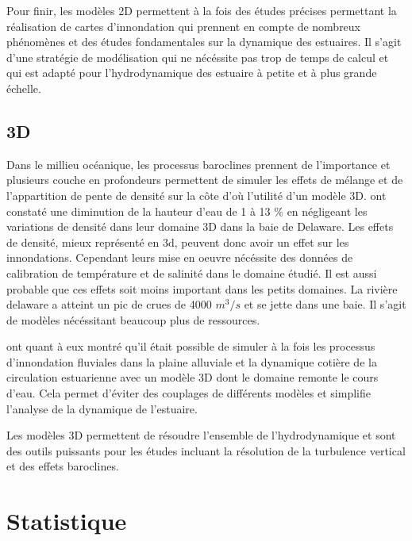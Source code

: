 \documentclass[12pt]{article}   %
\begin{document}
    Pour finir, les modèles 2D permettent à la fois des études précises permettant la réalisation de cartes d'innondation qui prennent en compte de nombreux phénomènes et des études fondamentales sur la dynamique des estuaires. Il s'agit d'une stratégie de modélisation qui ne nécéssite pas trop de temps de calcul et qui est adapté pour l'hydrodynamique des estuaire à petite et à plus grande échelle. 
    
    \subsection{3D}
    
    Dans le millieu océanique, les processus baroclines prennent de l'importance et plusieurs couche en profondeurs permettent de simuler les effets de mélange et de l'appartition de pente de densité sur la côte d'où l'utilité d'un modèle 3D. \cite{Orton2012} ont constaté une diminution de la hauteur d'eau de 1 à 13 $\%$ en négligeant les variations de densité dans leur domaine 3D dans la baie de Delaware. Les effets de densité, mieux représenté en 3d, peuvent donc avoir un effet sur les innondations. Cependant leurs mise en oeuvre nécéssite des données de calibration de température et de salinité dans le domaine étudié. Il est aussi probable que ces effets soit moins important dans les petits domaines. La rivière delaware a atteint un pic de crues de 4000 $m^3/s$ et se jette dans une baie. Il s'agit de modèles nécéssitant beaucoup plus de ressources. 
    
    \cite{Yang2012} ont quant à eux montré qu'il était possible de simuler à la fois les processus d'innondation fluviales dans la plaine alluviale et la dynamique cotière de la circulation estuarienne avec un modèle 3D dont le domaine remonte le cours d'eau. Cela permet d'éviter des couplages de différents modèles et simplifie l'analyse de la dynamique de l'estuaire. 
    

    Les modèles 3D permettent de résoudre l'ensemble de l'hydrodynamique et sont des outils puissants pour les études incluant la résolution de la turbulence vertical et des effets baroclines. 
    
    
    
\section{Statistique}
\end{document}
